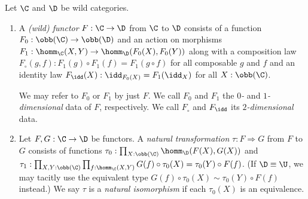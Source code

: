 \begin{defi}
Let $\C$ and $\D$ be wild categories.

\begin{enumerate}
\item A \emph{(wild) functor} $F : \C \to \D$ from $\C$ to $\D$ consists of a function $F_0 : \obb(\C) \to \obb(\D)$ and an action on morphisms $F_1  : \homm_{\C}(X,Y) \to \homm_{\D}(F_0(X), F_0(Y))$  along with a composition law $F_{\circ}(g,f)  : F_1(g) \circ F_1(f) = F_1(g \circ f) $ for all composable $g$ and $f$ and an identity law $F_{\idd}(X)   : \idd_{F_0(X)} = F_1(\idd_X)$ for all $X : \obb(\C)$.

We may refer to $F_0$ or $F_1$ by just $F$. We call $F_0$ and $F_1$ the \emph{$0$-} and \emph{$1$-dimensional} data of $F$, respectively. We call $F_{\circ}$ and $F_{\idd}$ its \emph{$2$-dimensional} data.

\item Let $F, G : \C \to \D$ be functors. A \emph{natural transformation} $\tau : F \Rightarrow G$ from $F$ to $G$ consists of functions 
$\tau_0 :\prod_{X : \obb(\C)}\homm_{\D}(F(X), G(X))$ and $\tau_1  : \prod_{X, Y : \obb(\C)}\prod_{f : \homm_{\C}(X , Y)}G(f) \circ \tau_0(X) = \tau_0(Y) \circ F(f)$. (If $\D \equiv \U$, we may tacitly use the equivalent type $G(f) \circ \tau_0(X) \sim \tau_0(Y) \circ F(f)$ instead.)
We say $\tau$ is a \emph{natural isomorphism} if each $\tau_0(X)$ is an equivalence.  
\end{enumerate}
\end{defi}

